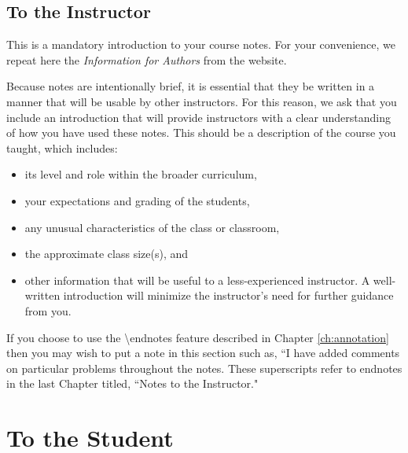 
\begin{annotation}
\chapter{To the Instructor}

This is a mandatory introduction to your course notes.  For your convenience, we repeat here
the \emph{Information for Authors} from the website.

Because notes are intentionally brief, it is essential that they be written in a manner that will be usable by other
instructors. For this reason, we ask that you include an introduction that will provide instructors
with a clear understanding of how you have used these notes. This should be a description of the
course you taught, which includes:
\begin{itemize}
\item  its level and role within the broader curriculum,
\item  your expectations and grading of the students,
\item  any unusual characteristics of the class or classroom,
\item  the approximate class size(s), and
\item other information that will be useful to a less-experienced instructor.
A well-written introduction will minimize the instructor's need for further guidance from you.
\end{itemize}

If you choose to use the \textbackslash endnotes feature described in Chapter \ref{ch:annotation} then
you may wish to put a note in this section such as, ``I have added comments on particular problems
throughout the notes.  These superscripts refer to endnotes in the last Chapter titled,
``Notes to the Instructor."

\end{annotation}



\chapter{ To the Student}

